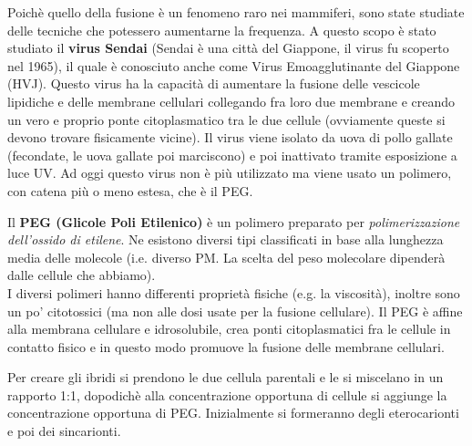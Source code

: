 \documentclass[11pt]{book}
\begin{document}
Poichè quello della fusione è un fenomeno raro nei mammiferi, sono state studiate delle tecniche che potessero aumentarne la frequenza. A questo scopo è stato studiato il \textbf{virus Sendai} (Sendai è una città del Giappone, il virus fu scoperto nel 1965), il quale è conosciuto anche come Virus Emoagglutinante del Giappone (HVJ). Questo virus ha la capacità di aumentare la fusione delle vescicole lipidiche e delle membrane cellulari collegando fra loro due membrane e creando un vero e proprio ponte citoplasmatico tra le due cellule (ovviamente queste si devono trovare fisicamente vicine). Il virus viene isolato da uova di pollo gallate (fecondate, le uova gallate poi marciscono) e poi inattivato tramite esposizione a luce UV. Ad oggi questo virus non è più utilizzato ma viene usato un polimero, con catena più o meno estesa, che è il PEG.

Il \textbf{PEG (Glicole Poli Etilenico)} è un polimero preparato per \emph{polimerizzazione dell'ossido di etilene}. Ne esistono diversi tipi classificati in base alla lunghezza media delle molecole (i.e. diverso PM. La scelta del peso molecolare dipenderà dalle cellule che abbiamo).\\
I diversi polimeri hanno differenti proprietà fisiche (e.g. la viscosità), inoltre sono un po' citotossici (ma non alle dosi usate per la fusione cellulare). Il PEG è affine alla membrana cellulare e idrosolubile, crea ponti citoplasmatici fra le cellule in contatto fisico e in questo modo promuove la fusione delle membrane cellulari.

Per creare gli ibridi si prendono le due cellula parentali e le si miscelano in un rapporto 1:1, dopodichè alla concentrazione opportuna di cellule si aggiunge la concentrazione opportuna di PEG. Inizialmente si formeranno degli eterocarionti e poi dei sincarionti.
\end{document}
